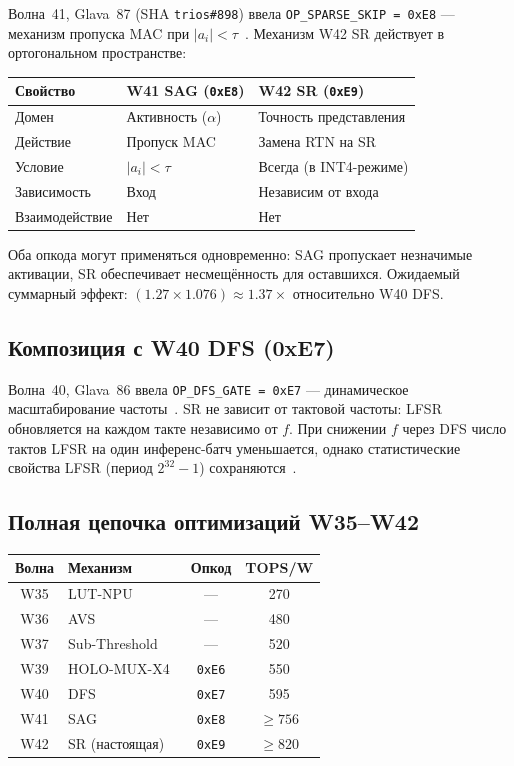 Волна~41, Glava~87 (SHA \texttt{trios\#898}) ввела
\texttt{OP\_SPARSE\_SKIP = 0xE8} — механизм пропуска MAC
при $|a_i| < \tau$~\cite{trios898,koren2024sparsity}.
Механизм W42 SR действует в ортогональном пространстве:

\begin{center}
\begin{tabular}{|l|l|l|}
\hline
Свойство & W41 SAG (\texttt{0xE8}) & W42 SR (\texttt{0xE9}) \\
\hline
Домен & Активность ($\alpha$) & Точность представления \\
Действие & Пропуск MAC & Замена RTN на SR \\
Условие & $|a_i| < \tau$ & Всегда (в INT4-режиме) \\
Зависимость & Вход & Независим от входа \\
Взаимодействие & Нет & Нет \\
\hline
\end{tabular}
\end{center}

Оба опкода могут применяться одновременно: SAG пропускает
незначимые активации, SR обеспечивает несмещённость
для оставшихся.  Ожидаемый суммарный эффект:
$(1{.}27 \times 1{.}076) \approx 1{.}37\times$ относительно W40 DFS.

\subsection{Композиция с W40 DFS (0xE7)}
\label{ssec:glava88-w40}

Волна~40, Glava~86 ввела \texttt{OP\_DFS\_GATE = 0xE7} —
динамическое масштабирование частоты~\cite{trios895}.
SR не зависит от тактовой частоты: LFSR обновляется на каждом
такте независимо от $f$.  При снижении $f$ через DFS
число тактов LFSR на один инференс-батч уменьшается,
однако статистические свойства LFSR (период $2^{32}-1$)
сохраняются~\cite{dettmers2022llmint8}.

\subsection{Полная цепочка оптимизаций W35--W42}
\label{ssec:glava88-chain}

\begin{center}
\begin{tabular}{|c|l|c|c|}
\hline
Волна & Механизм & Опкод & TOPS/W \\
\hline
W35 & LUT-NPU~\cite{trios886} & — & 270 \\
W36 & AVS~\cite{trios877} & — & 480 \\
W37 & Sub-Threshold~\cite{trios882} & — & 520 \\
W39 & HOLO-MUX-X4~\cite{trios891} & \texttt{0xE6} & 550 \\
W40 & DFS~\cite{trios895} & \texttt{0xE7} & 595 \\
W41 & SAG~\cite{trios898} & \texttt{0xE8} & $\geq 756$ \\
W42 & SR (настоящая) & \texttt{0xE9} & $\geq 820$ \\
\hline
\end{tabular}
\end{center}

